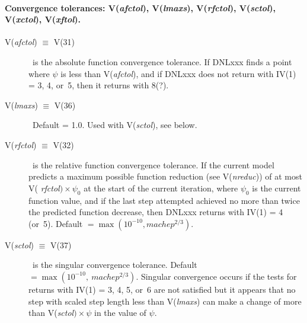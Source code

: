 \documentclass[twoside]{MATH77}
\begin{document}
\paragraph{Convergence tolerances: V({\em afctol}), V({\em lmaxs}),
V({\em rfctol}), V({\em sctol}), V({\em xctol}), V({\em xftol}).}
\begin{description}
\item[V({\em afctol}) $\equiv $ V(31)] \ is the absolute function
  convergence tolerance. If DNLxxx finds a point where $\psi $ is less
  than V({\em afctol}), and if DNLxxx does not return with IV(1) = 3,
  4, or~5, then it returns with 8(?).

\item[V({\em lmaxs}) $\equiv $ V(36)] \ Default = 1.0. Used with
  V({\em sctol}), see below.

\item[V({\em rfctol}) $\equiv $ V(32)] \ is the relative function
  convergence tolerance. If the current model predicts a maximum
  possible function reduction (see V({\em nreduc})) of at most V({\em
    rfctol}$)\times \psi_0$ at the start of the current iteration,
  where $\psi_0$ is the current function value, and if the last step
  attempted achieved no more than twice the predicted function
  decrease, then DNLxxx returns with IV(1) = 4 (or~5).  Default $=\max
  (10^{-10}, machep^{2/3}).$

\item[V({\em sctol}) $\equiv $ V(37)] \ is the singular convergence
  tolerance.  Default $=\max (10^{-10},\ machep^{2/3})$. Singular
  convergence occurs if the tests for returns with IV(1) = 3, 4, 5,
  or~6 are not satisfied but it appears that no step with scaled step
  length less than V({\em lmaxs}) can make a change of more than
  V({\em sctol}$)\times \psi $ in the value of $\psi .$


\end{description}
\end{document}

